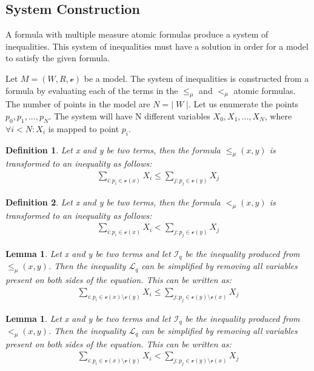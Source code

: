 \documentclass{article}
\newtheorem{defn}{Definition}[section]
\newtheorem{lemma}[theorem]{Lemma}
\newcommand{\vE}{\mathscr{v}}
\begin{document}
		\subsection{System Construction}
		A formula with multiple measure atomic formulas produce a system of inequalities.
		This system of inequalities must have a solution in order for a model to satisfy the given formula.

		Let $M = (W, R, \vE)$ be a model. The system of inequalities is constructed from a formula by evaluating each
		of the terms in the $\le_\mu$ and $<_\mu$ atomic formulas. The number of points in the model are $N = | \; W \; |$. Let us enumerate the points
		$p_0, p_1, ..., p_N$. The system will have N different variables $X_0, X_1, ..., X_N$, 
		where $\forall i < N: X_i$ is mapped to point $p_i$.

		\begin{defn}
			Let x and y be two terms, then the formula $\le_\mu(x, y)$ is transformed to an inequality as follows:
			\begin{align*}
				\sum_{i: p_i \in \vE(x)} X_i \leq \sum_{j: p_j \in \vE(y)} X_j
			\end{align*}
		\end{defn}

		\begin{defn}
			Let x and y be two terms, then the formula $<_\mu(x, y)$ is transformed to an inequality as follows:
			\begin{align*}
				\sum_{i: p_i \in \vE(x)} X_i < \sum_{j: p_j \in \vE(y)} X_j
			\end{align*}
		\end{defn}

		\begin{lemma} \label{measure_less_equal_without_duplication}
			Let x and y be two terms and let $\mathscr{I}_q$ be the inequality produced from $\le_\mu(x, y)$. Then the inequality $\mathscr{L}_q$ can be simplified 
			by removing all variables present on both sides of the equation. This can be written as:
			\begin{align*}
				\sum_{i: p_i \in \vE(x) \setminus \vE(y)} X_i \leq \sum_{j: p_j \in \vE(y) \setminus \vE(x)} X_j
			\end{align*}
		\end{lemma}

		\begin{lemma} \label{measure_less_without_duplication}
			Let x and y be two terms and let $\mathscr{I}_q$ be the inequality produced from $<_\mu(x, y)$. Then the inequality $\mathscr{L}_q$ can be simplified 
			by removing all variables present on both sides of the equation. This can be written as:
			\begin{align*}
				\sum_{i: p_i \in \vE(x) \setminus \vE(y)} X_i < \sum_{j: p_j \in \vE(y) \setminus \vE(x)} X_j
			\end{align*}
		\end{lemma}
\end{document}
